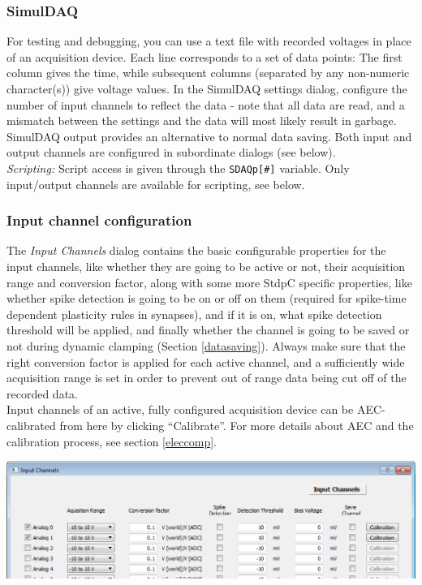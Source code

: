 \documentclass{article}
\begin{document}
\subsubsection{SimulDAQ}
For testing and debugging, you can use a text file with recorded voltages in place of
an acquisition device. Each line corresponds to a set of data points: The first column
gives the time, while subsequent columns (separated by any non-numeric character(s)) give
voltage values. In the SimulDAQ settings dialog, configure the number of input channels
to reflect the data - note that all data are read, and a mismatch between the settings and
the data will most likely result in garbage. SimulDAQ output provides an alternative to
normal data saving. Both input and output channels are configured in subordinate dialogs (see below).
\\
\emph{Scripting:} Script access is given through the \texttt{SDAQp[\#]} variable.
Only input/output channels are available for scripting, see below.

\subsubsection{Input channel configuration} \label{inchnconfig}

The \emph{Input Channels} dialog contains the basic configurable properties
for the input channels, like whether they are going to be active or not,
their acquisition range and conversion factor, along with some more StdpC specific
properties, like whether spike detection is going to be on or
off on them (required for spike-time dependent plasticity rules in synapses), and if it is on, what spike
detection threshold will be applied, and finally whether the channel is
going to be saved or not during dynamic clamping (Section \ref{datasaving}). Always make sure that the
right conversion factor is applied for each active channel, and a
sufficiently wide acquisition range is set in order to prevent out of range
data being cut off of the recorded data. \\
Input channels of an active, fully configured acquisition device can be AEC-calibrated from here by
clicking ``Calibrate''. For more details about AEC and the calibration process, see section \ref{eleccomp}.

\noindent
\parbox{\textwidth}{
	\includegraphics[scale=0.5]{inputChnDialog}
} \\[0.2cm]
\end{document}
